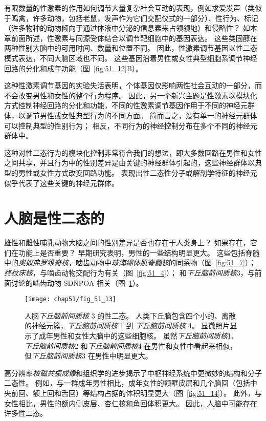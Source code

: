 有限数量的性激素的作用如何调节大量复杂社会互动的表现，例如求爱发声（类似于鸣禽，许多动物，包括老鼠，发声作为它们交配仪式的一部分）、性行为、标记 （许多物种的动物倾向于通过体液中分泌的信息素来占领领地）和侵略性？
如本章前面所述，性激素与同源受体结合以调节靶细胞中的基因表达。
这些类固醇在两种性别大脑中的可用时间、数量和位置不同。
因此，性激素调节基因以性二态模式表达，不同大脑区域也不同。
这些基因沿着男性或女性典型细胞系调节神经回路的分化和成年功能（图~\ref{fig:51_12}B）。


这种性激素调节基因的实验失活表明，个体基因仅影响两性社会互动的一部分，而不会改变男性和女性的整个行为程序。
因此，另一个新兴主题是性激素以模块化方式控制神经回路的分化和功能，不同的性激素调节基因作用于不同的神经元群体，以调节男性或女性典型行为的不同方面。
简而言之，没有单一的神经元群体可以控制典型的性别行为；
相反，不同行为的神经控制分布在多个不同的神经元群体中。


这种对性二态行为的模块化控制非常符合我们的想法，即大多数回路在男性和女性之间共享，并且行为中的性别差异是由关键的神经群体引起的，这些神经群体以典型的男性或女性方式改变回路功能。
表现出性二态性分子或解剖学特征的神经元似乎代表了这些关键的神经元群体。



\section{人脑是性二态的}

雄性和雌性哺乳动物大脑之间的性别差异是否也存在于人类身上？
如果存在，它们在功能上是否重要？
早期研究表明，男性的一些结构明显更大。
这些包括脊髓中的\textit{奥奴弗罗维奇核}，啮齿动物中\textit{球海绵体肌脊髓核}的同系物（图~\ref{fig:51_7}）；
\textit{终纹床核}，与啮齿动物交配行为有关（图~\ref{fig:51_4}）；
和\textit{下丘脑前间质核}3，与前面讨论的啮齿动物 SDNPOA 相关（图~\ref{fig:51_13}）。


\begin{figure}[htbp]
	\centering
	\texttt{[image: chap51/fig\_51\_13]}
	\caption{人脑\textit{下丘脑前间质核} 3 的性二态。
		人类下丘脑包含四个小的、离散的神经元簇，\textit{下丘脑前间质核} 1 到 \textit{下丘脑前间质核} 4。
		显微照片显示了成年男性和女性大脑中的这些细胞核。
		虽然\textit{下丘脑前间质核}1、\textit{下丘脑前间质核}2 和\textit{下丘脑前间质核}4 在男性和女性中看起来相似，但\textit{下丘脑前间质核}3 在男性中明显更大。\cite{gorski1988hormone} }
	\label{fig:51_13}
\end{figure}


高分辨率\textit{核磁共振成像}和组织学的进步揭示了中枢神经系统中更微妙的结构和分子二态性。
例如，与一群成年男性相比，成年女性的额眶皮层和几个脑回（包括中央前回、额上回和舌回）等结构占据的体积明显更大（图~\ref{fig:51_14}）。
此外，与女性相比，男性的额内侧皮层、杏仁核和角回体积更大。
因此，人脑中可能存在许多性二态。


